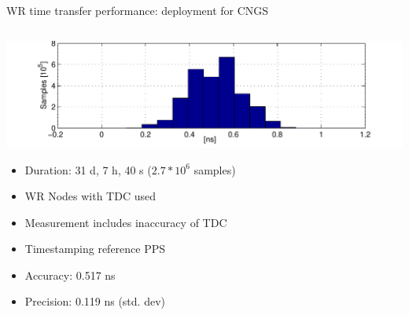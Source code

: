 \documentclass[compress,red]{beamer}
\begin{document}
\begin{frame}{WR time transfer performance: deployment for CNGS}

  \begin{columns}[c]
	  \begin{center}

		\hspace{-1cm}
		\includegraphics[width=1.1\textwidth]{measurements/histogram-small.pdf}
		\begin{itemize}
		       \item Duration: 31 d, 7 h, 40 s ($2.7*10^6$ samples)
		       \item WR Nodes with TDC used
		       \item Measurement includes inaccuracy of TDC
		       \item Timestamping reference PPS
		       	\item Accuracy: 0.517 ns
			\item Precision: 0.119 ns (std. dev)
		\end{itemize}			



\end{center}
\end{columns}
\end{frame}
\end{document}
